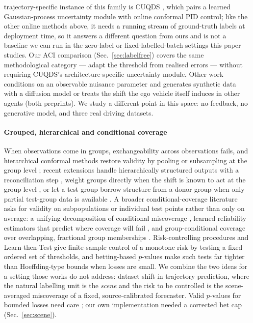 trajectory-specific instance of this family is CUQDS \cite{huang2025cuqds}, which pairs a learned Gaussian-process
uncertainty module with online conformal PID control; like the other online methods above, it needs a running stream
of ground-truth labels at deployment time, so it answers a different question from ours and is not a baseline we can
run in the zero-label or fixed-labelled-batch settings this paper studies. Our ACI comparison (Sec.~\ref{sec:labelfree})
covers the same methodological category --- adapt the threshold from realised errors --- without requiring CUQDS's
architecture-specific uncertainty module.
Other work conditions on an observable nuisance parameter and generates synthetic data with a diffusion model
\cite{rahaman2026shift} or treats the shift the ego vehicle itself induces in other agents \cite{binny2025moved}
(both preprints). We study a different point in this space: no feedback, no generative model, and three real driving
datasets.

\paragraph{Grouped, hierarchical and conditional coverage}
When observations come in groups, exchangeability across observations fails, and hierarchical conformal methods
restore validity by pooling or subsampling at the group level \cite{dunn2023hierarchical,lee2023hierarchical}; recent
extensions handle hierarchically structured outputs with a reconciliation step \cite{principato2024hierarchicaldata},
weight groups directly when the shift is known to act at the group level \cite{bhattacharyya2024groupweighted}, or let a
test group borrow structure from a donor group when only partial test-group data is available
\cite{mallick2026generalizedhcp}. A broader conditional-coverage literature asks for validity on subpopulations or
individual test points rather than only on average: a unifying decomposition of conditional miscoverage
\cite{min2026unifiedtheory}, learned reliability estimators that predict where coverage will fail
\cite{zhou2026cpassessment,braun2025diagnostics}, and group-conditional coverage over overlapping, fractional group
memberships \cite{bairaktari2025kandinsky}. Risk-controlling procedures \cite{bates2021rcps} and
Learn-then-Test \cite{angelopoulos2025ltt} give finite-sample control of a monotone risk by testing a fixed ordered
set of thresholds, and betting-based $p$-values \cite{waudbysmith2024betting} make such tests far tighter than
Hoeffding-type bounds when losses are small. We combine the two ideas for a setting those works do not address:
dataset shift in trajectory prediction, where the natural labelling unit is the \emph{scene} and the risk to be
controlled is the scene-averaged miscoverage of a fixed, source-calibrated forecaster. Valid $p$-values for bounded
losses need care \cite{alvarez2024pvalue}; our own implementation needed a corrected bet cap (Sec.~\ref{sec:scene}).

